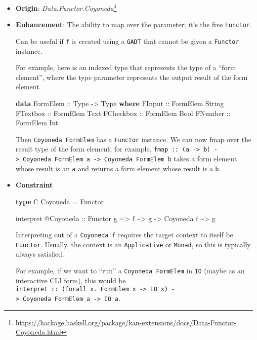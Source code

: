 \documentclass[]{article}
\newenvironment{Shaded}{}{}
\newcommand{\DataTypeTok}[1]{\textcolor[rgb]{0.56,0.13,0.00}{#1}}
\newcommand{\KeywordTok}[1]{\textcolor[rgb]{0.00,0.44,0.13}{\textbf{#1}}}
\newcommand{\NormalTok}[1]{#1}
\newcommand{\OperatorTok}[1]{\textcolor[rgb]{0.40,0.40,0.40}{#1}}
\newcommand{\OtherTok}[1]{\textcolor[rgb]{0.00,0.44,0.13}{#1}}
\renewcommand{\href}[2]{#2\footnote{\url{#1}}}
\begin{document}
\begin{itemize}
\item
  \textbf{Origin}:
  \emph{\href{https://hackage.haskell.org/package/kan-extensions/docs/Data-Functor-Coyoneda.html}{Data.Functor.Coyoneda}}
\item
  \textbf{Enhancement}: The ability to map over the parameter; it's the free
  \texttt{Functor}.

  Can be useful if \texttt{f} is created using a \texttt{GADT} that cannot be
  given a \texttt{Functor} instance.

  For example, here is an indexed type that represents the type of a ``form
  element'', where the type parameter represents the output result of the form
  element.

\begin{Shaded}
\begin{Highlighting}[]
\KeywordTok{data} \DataTypeTok{FormElem}\OtherTok{ ::} \DataTypeTok{Type} \OtherTok{{-}>} \DataTypeTok{Type} \KeywordTok{where}
    \DataTypeTok{FInput}\OtherTok{    ::} \DataTypeTok{FormElem} \DataTypeTok{String}
    \DataTypeTok{FTextbox}\OtherTok{  ::} \DataTypeTok{FormElem} \DataTypeTok{Text}
    \DataTypeTok{FCheckbox}\OtherTok{ ::} \DataTypeTok{FormElem} \DataTypeTok{Bool}
    \DataTypeTok{FNumber}\OtherTok{   ::} \DataTypeTok{FormElem} \DataTypeTok{Int}
\end{Highlighting}
\end{Shaded}

  Then \texttt{Coyoneda\ FormElem} has a \texttt{Functor} instance. We can now
  fmap over the result type of the form element; for example,
  \texttt{fmap\ ::\ (a\ -\textgreater{}\ b)\ -\textgreater{}\ Coyoneda\ FormElem\ a\ -\textgreater{}\ Coyoneda\ FormElem\ b}
  takes a form element whose result is an \texttt{a} and returns a form element
  whose result is a \texttt{b}.
\item
  \textbf{Constraint}

\begin{Shaded}
\begin{Highlighting}[]
\KeywordTok{type} \DataTypeTok{C} \DataTypeTok{Coyoneda} \OtherTok{=} \DataTypeTok{Functor}

\NormalTok{interpret }\OperatorTok{@}\DataTypeTok{Coyoneda}
\OtherTok{    ::} \DataTypeTok{Functor}\NormalTok{ g}
    \OtherTok{=>}\NormalTok{ f }\OperatorTok{\textasciitilde{}>}\NormalTok{ g}
    \OtherTok{{-}>} \DataTypeTok{Coyoneda}\NormalTok{ f }\OperatorTok{\textasciitilde{}>}\NormalTok{ g}
\end{Highlighting}
\end{Shaded}

  Interpreting out of a \texttt{Coyoneda\ f} requires the target context to
  itself be \texttt{Functor}. Usually, the context is an \texttt{Applicative} or
  \texttt{Monad}, so this is typically always satisfied.

  For example, if we want to ``run'' a \texttt{Coyoneda\ FormElem} in
  \texttt{IO} (maybe as an interactive CLI form), this would be
  \texttt{interpret\ ::\ (forall\ x.\ FormElem\ x\ -\textgreater{}\ IO\ x)\ -\textgreater{}\ Coyoneda\ FormElem\ a\ -\textgreater{}\ IO\ a}.
\end{itemize}
\end{document}
